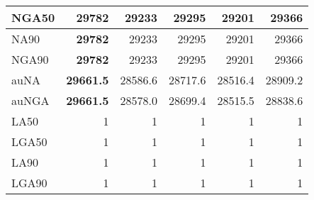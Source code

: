 \documentclass[12pt,a4paper]{article}
\begin{document}
\begin{table}[ht]
\begin{center}
\begin{tabular}{|l*{5}{|r}|}
NGA50 & {\bf 29782} & 29233 & 29295 & 29201 & 29366 \\ \hline
NA90 & {\bf 29782} & 29233 & 29295 & 29201 & 29366 \\ \hline
NGA90 & {\bf 29782} & 29233 & 29295 & 29201 & 29366 \\ \hline
auNA & {\bf 29661.5} & 28586.6 & 28717.6 & 28516.4 & 28909.2 \\ \hline
auNGA & {\bf 29661.5} & 28578.0 & 28699.4 & 28515.5 & 28838.6 \\ \hline
LA50 & 1 & 1 & 1 & 1 & 1 \\ \hline
LGA50 & 1 & 1 & 1 & 1 & 1 \\ \hline
LA90 & 1 & 1 & 1 & 1 & 1 \\ \hline
LGA90 & 1 & 1 & 1 & 1 & 1 \\ \hline
\end{tabular}
\end{center}
\end{table}
\end{document}
